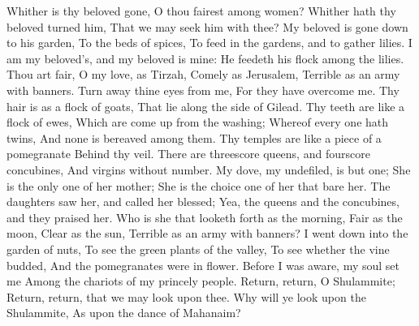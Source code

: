 Whither is thy beloved gone, O thou fairest among women? Whither hath thy beloved turned him, That we may seek him with thee?  My beloved is gone down to his garden, To the beds of spices, To feed in the gardens, and to gather lilies.  I am my beloved’s, and my beloved is mine: He feedeth his flock among the lilies.  Thou art fair, O my love, as Tirzah, Comely as Jerusalem, Terrible as an army with banners.  Turn away thine eyes from me, For they have overcome me. Thy hair is as a flock of goats, That lie along the side of Gilead.  Thy teeth are like a flock of ewes, Which are come up from the washing; Whereof every one hath twins, And none is bereaved among them.  Thy temples are like a piece of a pomegranate Behind thy veil.  There are threescore queens, and fourscore concubines, And virgins without number.  My dove, my undefiled, is but one; She is the only one of her mother; She is the choice one of her that bare her. The daughters saw her, and called her blessed; Yea, the queens and the concubines, and they praised her.  Who is she that looketh forth as the morning, Fair as the moon, Clear as the sun, Terrible as an army with banners?  I went down into the garden of nuts, To see the green plants of the valley, To see whether the vine budded, And the pomegranates were in flower.  Before I was aware, my soul set me Among the chariots of my princely people.  Return, return, O Shulammite; Return, return, that we may look upon thee. Why will ye look upon the Shulammite, As upon the dance of Mahanaim? 

